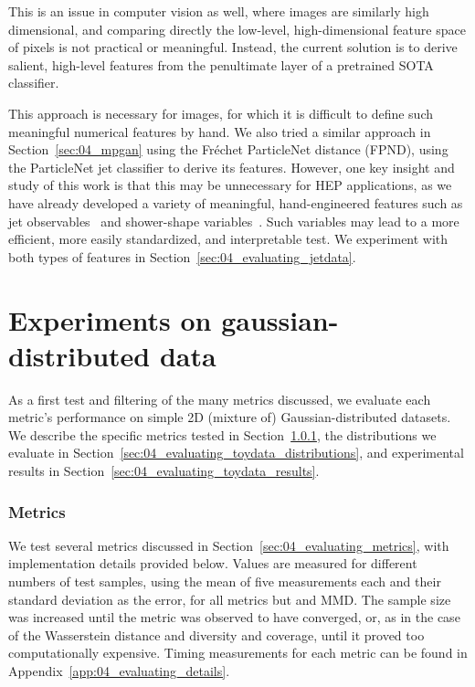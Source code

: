 This is an issue in computer vision as well, where images are similarly high dimensional, and comparing directly the low-level, high-dimensional feature space of pixels is not practical or meaningful.
Instead, the current solution is to derive salient, high-level features from the penultimate layer of a pretrained SOTA classifier.

This approach is necessary for images, for which it is difficult to define such meaningful numerical features by hand.
We also tried a similar approach in Section~\ref{sec:04_mpgan} using the Fr\'echet ParticleNet distance (FPND), using the ParticleNet jet classifier to derive its features.
However, one key insight and study of this work is that this may be unnecessary for HEP applications, as we have already developed a variety of meaningful, hand-engineered features such as jet observables~\cite{marzani_jets, larkoski2020jet, Komiske:2017aww} and shower-shape variables~\cite{baffioni_electronrecocms, atlas_photonrecoatlas}.
Such variables may lead to a more efficient, more easily standardized, and interpretable test.
We experiment with both types of features in Section~\ref{sec:04_evaluating_jetdata}. 

\section{Experiments on gaussian-distributed data}
\label{sec:04_evaluating_toydata} 

As a first test and filtering of the many metrics discussed, we evaluate each metric's performance on simple 2D (mixture of) Gaussian-distributed datasets. 
We describe the specific metrics tested in Section~\ref{sec:04_evaluating_toydata_metrics}, the distributions we evaluate in Section~\ref{sec:04_evaluating_toydata_distributions}, and experimental results in Section~\ref{sec:04_evaluating_toydata_results}. 


\subsubsection{Metrics}
\label{sec:04_evaluating_toydata_metrics}

We test several metrics discussed in Section~\ref{sec:04_evaluating_metrics}, with implementation details provided below. 
Values are measured for different numbers of test samples, using the mean of five measurements each and their standard deviation as the error, for all metrics but \fgdinf and MMD.
The sample size was increased until the metric was observed to have converged, or, as in the case of the Wasserstein distance and diversity and coverage, until it proved too computationally expensive.
Timing measurements for each metric can be found in Appendix~\ref{app:04_evaluating_details}.


